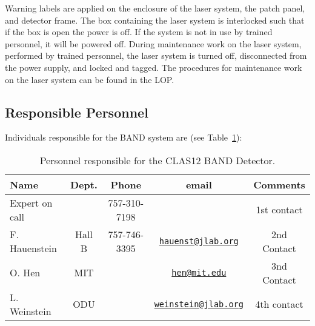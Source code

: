 Warning labels are applied on the enclosure of the laser system, the patch panel, and detector frame. The
box containing the laser system is interlocked such that if the box is open the power is off. If the system
is not in use by trained personnel, it will be powered off. During maintenance work on the laser system,
performed by trained personnel, the laser system is turned off, disconnected from the power supply, and
locked and tagged. The procedures for maintenance work on the laser system can be found in the LOP.

\subsection{Responsible Personnel}
\indent

Individuals responsible for the BAND system are (see Table~\ref{tb:band}):

\begin{table}[!htb]
 \centering
 \begin{tabular}{|l|c|c|c|c|}
\hline
 Name           & Dept.  & Phone        & email                    & Comments \\ \hline
Expert on call  &        & 757-310-7198 &                          & 1st contact \\ \hline
F. Hauenstein   & Hall B & 757-746-3395 & \href{mailto:hauenst@jlab.org}{\nolinkurl{hauenst@jlab.org}}     & 2nd Contact \\ \hline
O. Hen          & MIT    &              & \href{mailto:hen@mit.edu}{\nolinkurl{hen@mit.edu}}               & 3nd Contact \\ \hline
L. Weinstein    & ODU    &              & \href{mailto:weinstein@jlab.org}{\nolinkurl{weinstein@jlab.org}} & 4th contact  \\ \hline
 \end{tabular}
\caption{Personnel responsible for the CLAS12 BAND Detector.} 
\label{tb:band}
\end{table}

